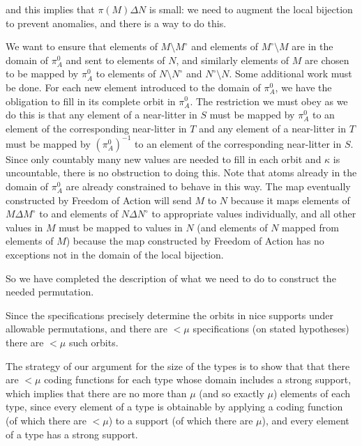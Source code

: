 \documentclass[112pt]{article}
\begin{document}
\begin{description}
and this implies that $\pi(M) \Delta N$ is small:  we need to augment the local bijection to prevent anomalies, and there is a way to do this.

We want to ensure that elements of $M \setminus M^{\circ}$ and elements of $M^{\circ} \setminus M$ are in the domain of $\pi^0_A$ and sent to elements of $N$, and similarly elements of $M$ are chosen to be mapped by $\pi^0_A$ to elements of $N\setminus N^\circ$ and $N^\circ \setminus N$.
 Some additional work must be done.  For each new element introduced to the domain of $\pi^0_A$, we have the obligation to fill in its complete orbit in $\pi^0_A$.   The restriction we must obey as we do this is that any element of a near-litter in $S$ must be mapped by $\pi^0_A$ to an element of the corresponding near-litter in $T$ and any element of a near-litter in $T$  must be mapped by $(\pi^0_A)^{-1}$ to an element of the corresponding near-litter in $S$.  Since only countably many new values are needed to fill in each orbit and $\kappa$ is uncountable, there is no obstruction to doing this.  Note that atoms already in the domain of $\pi^0_A$ are already constrained to behave in this way.  The map eventually constructed by Freedom of Action will send
$M$ to $N$ because it maps elements of $M \Delta M^\circ$ to and elements of $N \Delta N^{\circ}$ to appropriate values individually, and all other values in $M$ must be mapped to values in $N$ (and elements of $N$ mapped from elements of $M$) because the map constructed by Freedom of Action has no exceptions not in the domain of the local bijection.

So we have completed the description of what we need to do to construct the needed permutation.

\end{description}

Since the specifications precisely determine the orbits in nice supports under allowable permutations, and there are $<\mu$ specifications
(on stated hypotheses) there are $<\mu$ such orbits.

The strategy of our argument for the size of the types is to show that that there are $<\mu$ coding functions for each type whose domain includes a strong support, which implies that there are no more than $\mu$ (and so exactly $\mu$) elements of each type, since every element of a type is obtainable by applying a coding function (of which there are $<\mu$) to a support (of which there are $\mu$), and every element of a type has a strong support.
\end{document}
